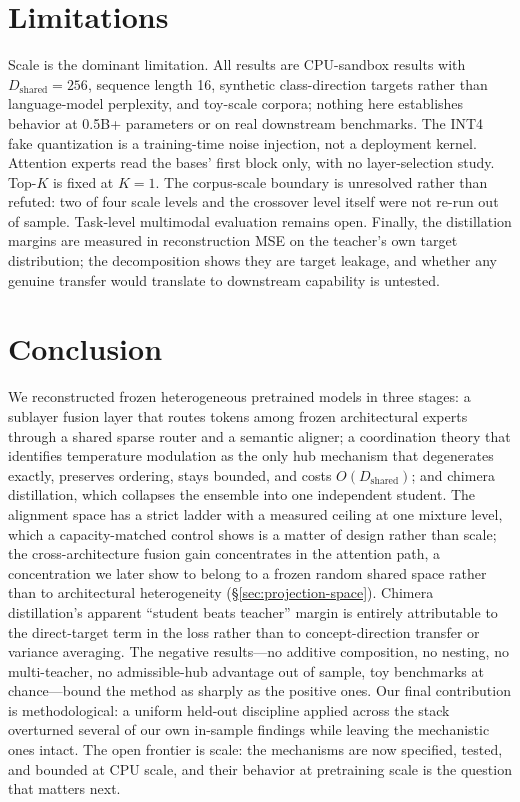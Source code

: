 \documentclass[10pt,twoside]{article}
\theoremstyle{definition}
\theoremstyle{plain}
\theoremstyle{remark}
\begin{document}
\section{Limitations}
\label{sec:limitations}

Scale is the dominant limitation. All results are CPU-sandbox results with $D_{\text{shared}}{=}256$, sequence length 16, synthetic class-direction targets rather than language-model perplexity, and toy-scale corpora; nothing here establishes behavior at 0.5B+ parameters or on real downstream benchmarks. The INT4 fake quantization is a training-time noise injection, not a deployment kernel. Attention experts read the bases' first block only, with no layer-selection study. Top-$K$ is fixed at $K{=}1$. The corpus-scale boundary is unresolved rather than refuted: two of four scale levels and the crossover level itself were not re-run out of sample. Task-level multimodal evaluation remains open. Finally, the distillation margins are measured in reconstruction MSE on the teacher's own target distribution; the decomposition shows they are target leakage, and whether any genuine transfer would translate to downstream capability is untested.

\section{Conclusion}
\label{sec:conclusion}

We reconstructed frozen heterogeneous pretrained models in three stages: a sublayer fusion layer that routes tokens among frozen architectural experts through a shared sparse router and a semantic aligner; a coordination theory that identifies temperature modulation as the only hub mechanism that degenerates exactly, preserves ordering, stays bounded, and costs $O(D_{\text{shared}})$; and chimera distillation, which collapses the ensemble into one independent student. The alignment space has a strict ladder with a measured ceiling at one mixture level, which a capacity-matched control shows is a matter of design rather than scale; the cross-architecture fusion gain concentrates in the attention path, a concentration we later show to belong to a frozen random shared space rather than to architectural heterogeneity (\S\ref{sec:projection-space}). Chimera distillation's apparent ``student beats teacher'' margin is entirely attributable to the direct-target term in the loss rather than to concept-direction transfer or variance averaging. The negative results---no additive composition, no nesting, no multi-teacher, no admissible-hub advantage out of sample, toy benchmarks at chance---bound the method as sharply as the positive ones. Our final contribution is methodological: a uniform held-out discipline applied across the stack overturned several of our own in-sample findings while leaving the mechanistic ones intact. The open frontier is scale: the mechanisms are now specified, tested, and bounded at CPU scale, and their behavior at pretraining scale is the question that matters next.
\end{document}
